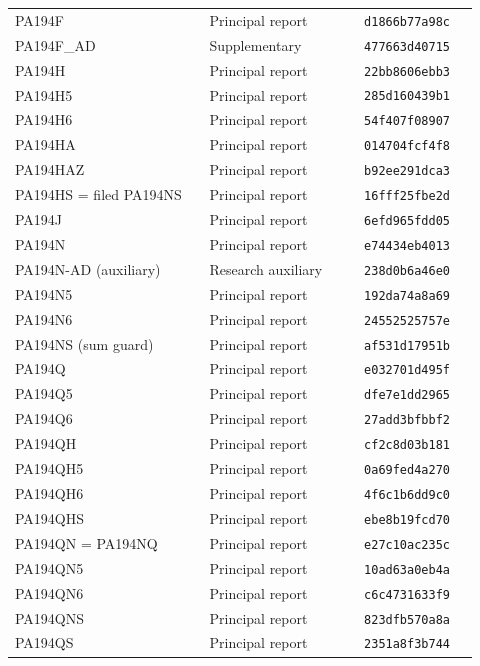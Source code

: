 \begin{longtable}{@{}p{0.39\linewidth}p{0.31\linewidth}p{0.23\linewidth}@{}}
PA194F & Principal report & \texttt{d1866b77a98c}\\[3pt]
PA194F\_\allowbreak{}AD & Supplementary & \texttt{477663d40715}\\[3pt]
PA194H & Principal report & \texttt{22bb8606ebb3}\\[3pt]
PA194H5 & Principal report & \texttt{285d160439b1}\\[3pt]
PA194H6 & Principal report & \texttt{54f407f08907}\\[3pt]
PA194HA & Principal report & \texttt{014704fcf4f8}\\[3pt]
PA194HAZ & Principal report & \texttt{b92ee291dca3}\\[3pt]
PA194HS = filed PA194NS & Principal report & \texttt{16fff25fbe2d}\\[3pt]
PA194J & Principal report & \texttt{6efd965fdd05}\\[3pt]
PA194N & Principal report & \texttt{e74434eb4013}\\[3pt]
PA194N-AD (auxiliary) & Research auxiliary & \texttt{238d0b6a46e0}\\[3pt]
PA194N5 & Principal report & \texttt{192da74a8a69}\\[3pt]
PA194N6 & Principal report & \texttt{24552525757e}\\[3pt]
PA194NS (sum guard) & Principal report & \texttt{af531d17951b}\\[3pt]
PA194Q & Principal report & \texttt{e032701d495f}\\[3pt]
PA194Q5 & Principal report & \texttt{dfe7e1dd2965}\\[3pt]
PA194Q6 & Principal report & \texttt{27add3bfbbf2}\\[3pt]
PA194QH & Principal report & \texttt{cf2c8d03b181}\\[3pt]
PA194QH5 & Principal report & \texttt{0a69fed4a270}\\[3pt]
PA194QH6 & Principal report & \texttt{4f6c1b6dd9c0}\\[3pt]
PA194QHS & Principal report & \texttt{ebe8b19fcd70}\\[3pt]
PA194QN = PA194NQ & Principal report & \texttt{e27c10ac235c}\\[3pt]
PA194QN5 & Principal report & \texttt{10ad63a0eb4a}\\[3pt]
PA194QN6 & Principal report & \texttt{c6c4731633f9}\\[3pt]
PA194QNS & Principal report & \texttt{823dfb570a8a}\\[3pt]
PA194QS & Principal report & \texttt{2351a8f3b744}\\[3pt]

\end{longtable}
